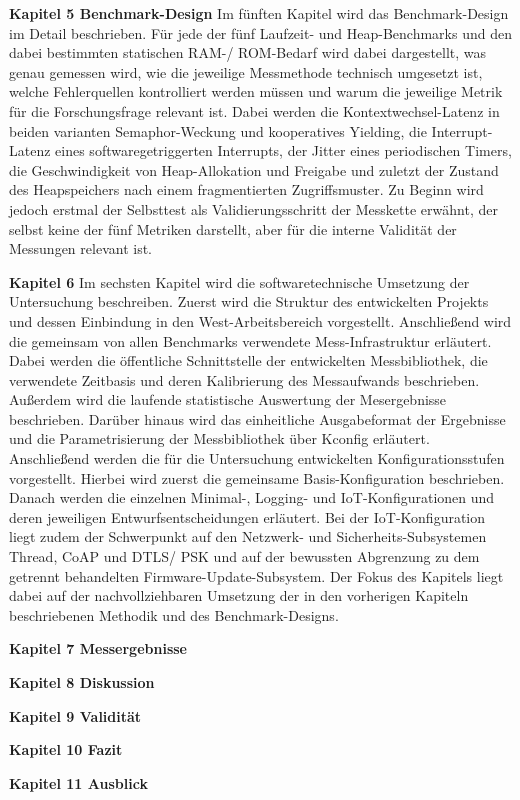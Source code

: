 \textbf{Kapitel 5 Benchmark-Design }Im f{\"u}nften Kapitel wird das Benchmark-Design im Detail\textbf{ }beschrieben.\textbf{ }F{\"u}r jede der f{\"u}nf Laufzeit- und Heap-Benchmarks und den dabei bestimmten statischen RAM-/ ROM-Bedarf wird dabei dargestellt, was genau gemessen wird, wie die jeweilige Messmethode technisch umgesetzt ist, welche Fehlerquellen kontrolliert werden m{\"u}ssen und warum die jeweilige Metrik f{\"u}r die Forschungsfrage relevant ist. Dabei werden die Kontextwechsel-Latenz in beiden varianten Semaphor-Weckung und kooperatives Yielding, die Interrupt-Latenz eines softwaregetriggerten Interrupts, der Jitter eines periodischen Timers, die Geschwindigkeit von Heap-Allokation und Freigabe und zuletzt der Zustand des Heapspeichers nach einem fragmentierten Zugriffsmuster. Zu Beginn wird jedoch erstmal der Selbsttest als Validierungsschritt der Messkette erw{\"a}hnt, der selbst keine der f{\"u}nf Metriken darstellt, aber f{\"u}r die interne Validit{\"a}t der Messungen relevant ist.\textbf{ }

\textbf{Kapitel 6 }Im sechsten Kapitel wird die softwaretechnische Umsetzung der Untersuchung beschreiben. Zuerst wird die Struktur des entwickelten Projekts und dessen Einbindung in den West-Arbeitsbereich vorgestellt. Anschlie{\ss}end wird die gemeinsam von allen Benchmarks verwendete Mess-Infrastruktur erl{\"a}utert. Dabei werden die {\"o}ffentliche Schnittstelle der entwickelten Messbibliothek, die verwendete Zeitbasis und deren Kalibrierung des Messaufwands beschrieben. Au{\ss}erdem wird die laufende statistische Auswertung der Mesergebnisse beschrieben. Dar{\"u}ber hinaus wird das einheitliche Ausgabeformat der Ergebnisse und die Parametrisierung der Messbibliothek {\"u}ber Kconfig erl{\"a}utert.\textbf{ }Anschlie{\ss}end werden die f{\"u}r die Untersuchung entwickelten Konfigurationsstufen vorgestellt. Hierbei wird zuerst die gemeinsame Basis-Konfiguration beschrieben. Danach werden die einzelnen Minimal-, Logging- und IoT-Konfigurationen und deren jeweiligen Entwurfsentscheidungen erl{\"a}utert. Bei der IoT-Konfiguration liegt zudem der Schwerpunkt auf den Netzwerk- und Sicherheits-Subsystemen Thread, CoAP und DTLS/ PSK und auf der bewussten Abgrenzung zu dem getrennt behandelten Firmware-Update-Subsystem. Der Fokus des Kapitels liegt dabei auf der nachvollziehbaren Umsetzung der in den vorherigen Kapiteln beschriebenen Methodik und des Benchmark-Designs.

\textbf{Kapitel 7 Messergebnisse}

\textbf{Kapitel 8 Diskussion}

\textbf{Kapitel 9 Validit{\"a}t}

\textbf{Kapitel 10 Fazit}

\textbf{Kapitel 11 Ausblick}
